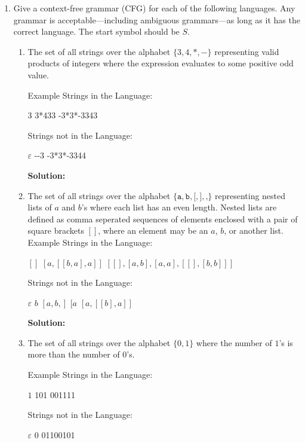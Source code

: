 \documentclass[11pt]{article}
\newcommand\tab[1][1cm]{\hspace*{#1}}
\let\epsilon\varepsilon
\begin{document}
\begin{enumerate}
\item  Give a context-free grammar (CFG) for each of the following languages. Any grammar is acceptable---including ambiguous grammars---as long as it has the correct language. The start symbol should be $S$.
  \begin{enumerate}
    \item The set of all strings over the alphabet $\{3,4,*,-\}$ representing valid products of integers where the expression evaluates to some positive odd value.

    Example Strings in the Language:
    \begin{center}
      3 \tab \tab 3*433 \tab \tab -3*3*-3343
    \end{center}
    Strings not in the Language:
    \begin{center}
      $\epsilon$ \tab \tab -{}-3  \tab \tab -3*3*-3344
    \end{center}
    
    \textbf{Solution:}
    

    \item The set of all strings over the alphabet $\{\texttt{a}, \texttt{b}, \texttt{[}, \texttt{]}, \texttt{,}\}$ representing nested lists of $a$ and $b$'s where each list has an even length. Nested lists are defined as comma seperated sequences of elements enclosed with a pair of square brackets $[]$, where an element may be an $a$, $b$, or another list. 
    Example Strings in the Language:
    \begin{center}
        $[]$ \tab \tab $[a, [[b, a], a]]$ \tab \tab $[[], [a,b], [a,a], [[], [b,b]]]$
    \end{center}
    Strings not in the Language:
    \begin{center}
      $\epsilon$ \tab \tab $b$ \tab \tab $[a,b,]$  \tab \tab $[a$ \tab \tab $[a, [[b], a]]$
    \end{center}

    \textbf{Solution:}

  \item The set of all strings over the alphabet $\{0, 1\}$ where the number of $1$'s is more than the number of $0$'s.

    Example Strings in the Language:
    \begin{center}
      $1$ \tab \tab 101 \tab \tab 001111
    \end{center}
    Strings not in the Language: 
    \begin{center}
      $\epsilon$ \tab \tab 0 \tab \tab 01100101
    \end{center}


\end{enumerate}
\end{enumerate}
\end{document}
